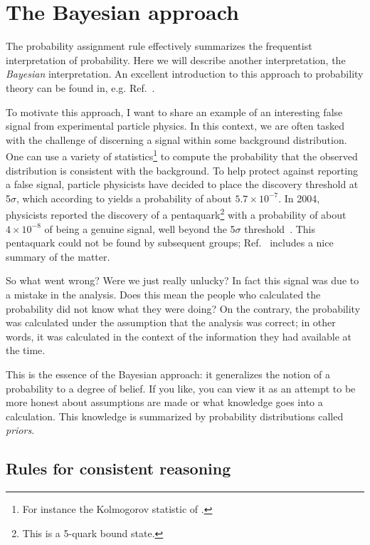 \section{The Bayesian approach}\label{sec:bayes}

The probability assignment rule  effectively summarizes 
the frequentist interpretation of probability. Here we
will describe another interpretation, the {\it Bayesian} interpretation. An excellent introduction to this approach
to probability theory can be found in, e.g. Ref.~\cite{sivia_data_2006}.

To motivate this approach, I want to share an example of an interesting false
signal from experimental particle physics. In this context, we are often tasked
with the challenge of discerning a signal within some background distribution.
One can use a variety of statistics\footnote{For instance the Kolmogorov
statistic of .} to compute the probability that the observed
distribution is consistent with the background. To help protect against
reporting a false signal, particle physicists have decided to place the
discovery threshold at 5$\sigma$, which according to 
yields a probability of about $5.7\times10^{-7}$. In 2004, physicists
reported the discovery of a pentaquark\footnote{This is a
5-quark bound state.} with a probability of about
$4\times10^{-8}$ of being a genuine signal, well beyond the
5$\sigma$ threshold~\cite{aktas_evidence_2004}. This pentaquark could
not be found by subsequent groups; Ref.~\cite{rossi_tetra-quarks_2021}
includes a nice summary of the matter.

So what went wrong? Were we just really unlucky? In fact this signal was due to
a mistake in the analysis. Does this mean the people who calculated the
probability did not know what they were doing? On the contrary, the probability
was calculated under the assumption that the analysis was correct; in other
words, it was calculated in the context of the information they had available at
the time.

This is the essence of the Bayesian approach: it generalizes the notion of a 
probability to a degree of belief. If you like, you can view it as an attempt to
be more honest about assumptions are made or what knowledge goes into a
calculation. This knowledge is summarized by probability distributions called
{\it priors}.

\subsection{Rules for consistent reasoning}\label{sec:consistentReasoning}

